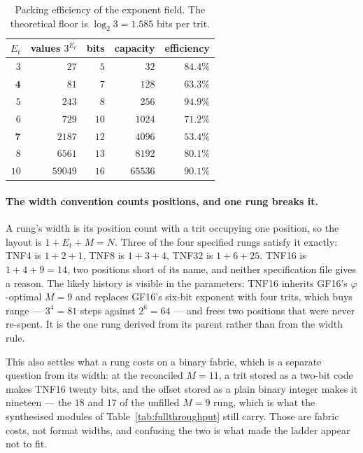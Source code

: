 \begin{table}[t]\centering
\caption{Packing efficiency of the exponent field. The theoretical floor is
$\log_2 3 = 1.585$ bits per trit.}
\label{tab:pack}
\begin{tabular}{rrrrr}
\toprule
$E_t$ & values $3^{E_t}$ & bits & capacity & efficiency \\
\midrule
$3$  & $27$    & $5$  & $32$   & $84.4\%$ \\
$\mathbf{4}$  & $81$    & $7$  & $128$  & $\mathbf{63.3\%}$ \\
$5$  & $243$   & $8$  & $256$  & $\mathbf{94.9\%}$ \\
$6$  & $729$   & $10$ & $1024$ & $71.2\%$ \\
$\mathbf{7}$  & $2187$  & $12$ & $4096$ & $\mathbf{53.4\%}$ \\
$8$  & $6561$  & $13$ & $8192$ & $80.1\%$ \\
$10$ & $59049$ & $16$ & $65536$ & $90.1\%$ \\
\bottomrule
\end{tabular}
\end{table}

\paragraph{The width convention counts positions, and one rung breaks it.}
A rung's width is its position count with a trit occupying one position, so the
layout is $1 + E_t + M = N$. Three of the four specified rungs satisfy it exactly:
TNF4 is $1+2+1$, TNF8 is $1+3+4$, TNF32 is $1+6+25$. TNF16 is
$1+4+9 = 14$, two positions short of its name, and neither specification file
gives a reason. The likely history is visible in the parameters: TNF16 inherits
GF16's $\varphi$-optimal $M = 9$ and replaces GF16's six-bit exponent with four
trits, which buys range --- $3^4 = 81$ steps against $2^6 = 64$ --- and frees two
positions that were never re-spent. It is the one rung derived from its parent
rather than from the width rule.

This also settles what a rung costs on a binary fabric, which is a separate
question from its width: at the reconciled $M = 11$, a trit stored as a two-bit
code makes TNF16 twenty bits, and the offset stored as a plain binary integer
makes it nineteen --- the $18$ and $17$ of the unfilled $M = 9$ rung, which is
what the synthesised modules of Table~\ref{tab:fullthroughput} still carry. Those
are fabric costs, not format widths, and confusing the two is what made the
ladder appear not to fit.

